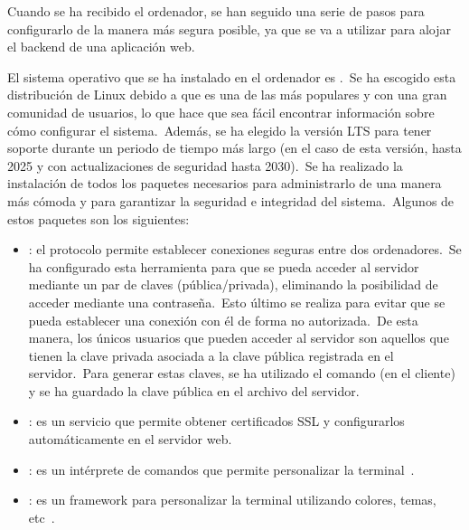 Cuando se ha recibido el ordenador, se han seguido una serie de pasos para configurarlo de la manera más segura posible,
ya que se va a utilizar para alojar el backend de una aplicación web.

El sistema operativo que se ha instalado en el ordenador es .\ Se ha escogido esta
distribución de Linux debido a que es una de las más populares y con una gran comunidad de usuarios, lo que
hace que sea fácil encontrar información sobre cómo configurar el sistema.\ Además, se ha elegido la versión LTS para
tener soporte durante un periodo de tiempo más largo (en el caso de esta versión, hasta 2025 y con actualizaciones de
seguridad hasta 2030).\ Se ha realizado la instalación de todos los paquetes necesarios para administrarlo de una
manera más cómoda y para garantizar la seguridad e integridad del sistema.\ Algunos de estos paquetes son los
siguientes:
\begin{itemize}
	\item {}: el protocolo  permite establecer conexiones seguras entre dos
	ordenadores.\ Se ha configurado esta herramienta para que se pueda acceder al servidor mediante un par de claves
	(pública/privada), eliminando la posibilidad de acceder mediante una contraseña.\ Esto último se realiza para
	evitar que se pueda establecer una conexión con él de forma no autorizada.\ De esta manera, los únicos usuarios
	que pueden acceder al servidor son aquellos que tienen la clave privada asociada a la clave pública registrada en
	el servidor.\ Para generar estas claves, se ha utilizado el comando  (en el cliente) y se ha
	guardado la clave pública en el archivo  del servidor.

	\item {}: es un servicio que permite obtener certificados SSL y configurarlos automáticamente en el
	servidor web.
	\item {}: es un intérprete de comandos que permite personalizar la terminal~\cite{zsh-def}.
	\item {}: es un framework para personalizar la terminal utilizando colores, temas,
	etc~\cite{oh-my-zsh-def}.
\end{itemize}
\label{itm:os_packages}

